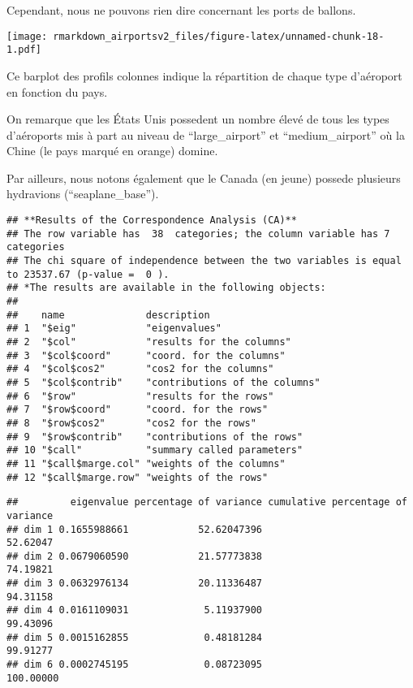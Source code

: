\documentclass[
]{compterendu}
\begin{document}
Cependant, nous ne pouvons rien dire concernant les ports de ballons.

\texttt{[image: rmarkdown\_airportsv2\_files/figure-latex/unnamed-chunk-18-1.pdf]}

Ce barplot des profils colonnes indique la répartition de chaque type
d'aéroport en fonction du pays.

On remarque que les États Unis possedent un nombre élevé de tous les
types d'aéroports mis à part au niveau de ``large\_airport'' et
``medium\_airport'' où la Chine (le pays marqué en orange) domine.

Par ailleurs, nous notons également que le Canada (en jeune) possede
plusieurs hydravions (``seaplane\_base'').

\begin{verbatim}
## **Results of the Correspondence Analysis (CA)**
## The row variable has  38  categories; the column variable has 7 categories
## The chi square of independence between the two variables is equal to 23537.67 (p-value =  0 ).
## *The results are available in the following objects:
## 
##    name              description                   
## 1  "$eig"            "eigenvalues"                 
## 2  "$col"            "results for the columns"     
## 3  "$col$coord"      "coord. for the columns"      
## 4  "$col$cos2"       "cos2 for the columns"        
## 5  "$col$contrib"    "contributions of the columns"
## 6  "$row"            "results for the rows"        
## 7  "$row$coord"      "coord. for the rows"         
## 8  "$row$cos2"       "cos2 for the rows"           
## 9  "$row$contrib"    "contributions of the rows"   
## 10 "$call"           "summary called parameters"   
## 11 "$call$marge.col" "weights of the columns"      
## 12 "$call$marge.row" "weights of the rows"
\end{verbatim}

\begin{verbatim}
##         eigenvalue percentage of variance cumulative percentage of variance
## dim 1 0.1655988661            52.62047396                          52.62047
## dim 2 0.0679060590            21.57773838                          74.19821
## dim 3 0.0632976134            20.11336487                          94.31158
## dim 4 0.0161109031             5.11937900                          99.43096
## dim 5 0.0015162855             0.48181284                          99.91277
## dim 6 0.0002745195             0.08723095                         100.00000
\end{verbatim}
\end{document}
